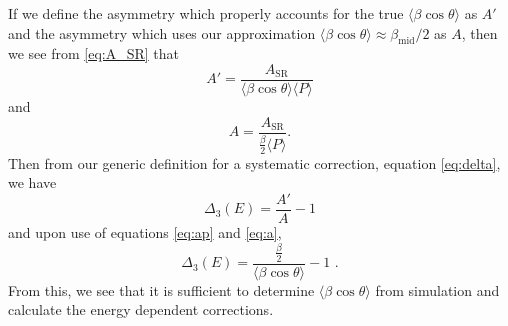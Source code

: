 If we define the asymmetry which properly accounts for the true $\langle\beta\cos\theta\rangle$
as $A'$ and the asymmetry which uses our approximation
$\langle\beta\cos\theta\rangle \approx \beta_{\mathrm{mid}}/2$ as $A$, then we see from
\ref{eq:A_SR} that
%
\begin{equation} \label{eq:ap}
  A' = \frac{A_{\mathrm{SR}}}{\langle\beta\cos\theta\rangle \langle P \rangle}
\end{equation}
%
\noindent and
%
\begin{equation} \label{eq:a}
  A = \frac{A_{\mathrm{SR}}}{\frac{\beta}{2} \langle P \rangle}.
\end{equation}
%
\noindent Then from our generic definition for a systematic correction, equation
\ref{eq:delta}, we have
%
\begin{equation*}
\Delta_3(E) = \frac{A'}{A}-1
\end{equation*}
%
\noindent and upon use of equations \ref{eq:ap} and \ref{eq:a},
%
\begin{equation} \label{eq:delta3def}
\Delta_3(E) = \frac{\frac{\beta}{2}}{\langle\beta\cos\theta\rangle}-1\textrm{ .}
\end{equation}
%
\noindent From this, we see that it is sufficient to determine $\langle\beta\cos\theta\rangle$
from simulation and calculate the energy dependent corrections.

